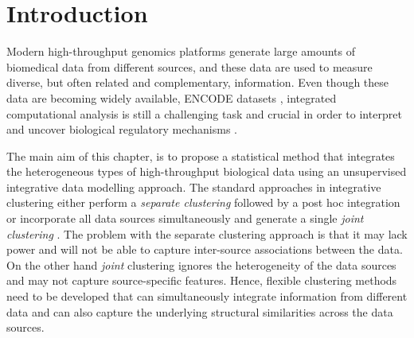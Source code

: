 \section{Introduction} \label{integr-intro-sect}
Modern high-throughput genomics platforms generate large amounts of biomedical data from different sources, and these data are used to measure diverse, but often related and complementary, information. Even though these data are becoming widely available, \eg ENCODE datasets \citep{Dunham2012}, integrated computational analysis is still a challenging task and crucial in order to interpret and uncover biological regulatory mechanisms \citep{Park2009}.   

The main aim of this chapter, is to propose a statistical method that integrates the heterogeneous types of high-throughput biological data using an unsupervised integrative data modelling approach. The standard approaches in integrative clustering either perform a \emph{separate clustering} followed by a post hoc integration \citep{Wang2011} or incorporate all data sources simultaneously and generate a single \emph{joint clustering} \citep{Kormaksson2012, Mo2013}. The problem with the separate clustering approach is that it may lack power and will not be able to capture inter-source associations between the data. On the other hand \emph{joint} clustering ignores the heterogeneity of the data sources and may not capture source-specific features. Hence, flexible clustering methods need to be developed that can simultaneously integrate information from different data and can also capture the underlying structural similarities across the data sources.